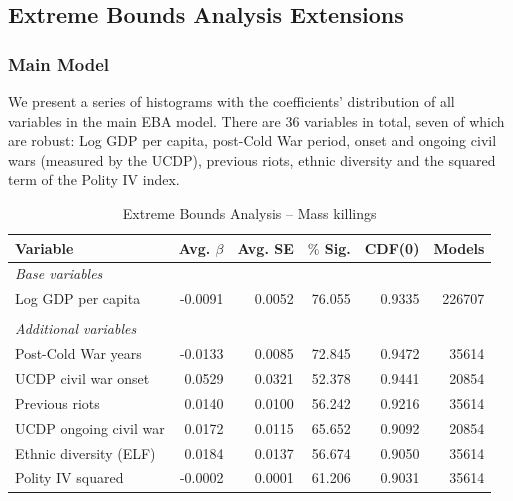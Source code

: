 \newpage

\subsection{Extreme Bounds Analysis Extensions}
\label{sec:mk-ebae}

\subsubsection{Main Model}

We present a series of histograms with the coefficients' distribution of all variables in the main EBA model. There are 36 variables in total, seven of which are robust: Log GDP per capita, post-Cold War period, onset and ongoing civil wars (measured by the UCDP), previous riots, ethnic diversity and the squared term of the Polity IV index.

\vspace{1cm}

\begin{table}[H]
\centering
\begin{tabular}{lrrrrr}
\hline
\textbf{Variable} & \textbf{Avg. $\beta$} & \textbf{Avg. SE} & \textbf{$\%$ Sig.} & \textbf{CDF(0)} & \textbf{Models} \\ \hline
\textit{Base variables} &  &  &  &  &  \\
Log GDP per capita & -0.0091 & 0.0052 & 76.055 & 0.9335 & 226707 \\
 &  &  &  &  &  \\
\textit{Additional variables} &  &  &  &  &  \\
Post-Cold War years & -0.0133 & 0.0085 & 72.845 & 0.9472 & 35614 \\
UCDP civil war onset & 0.0529 & 0.0321 & 52.378 & 0.9441 & 20854 \\
Previous riots & 0.0140 & 0.0100 & 56.242 & 0.9216 & 35614 \\
UCDP ongoing civil war & 0.0172 & 0.0115 & 65.652 & 0.9092 & 20854 \\
Ethnic diversity (ELF) & 0.0184 & 0.0137 & 56.674 & 0.9050 & 35614 \\
Polity IV squared & -0.0002 & 0.0001 & 61.206 & 0.9031 & 35614 \\ \hline
\end{tabular}
\caption{Extreme Bounds Analysis -- Mass killings}
\label{tab:mk}
\end{table}

